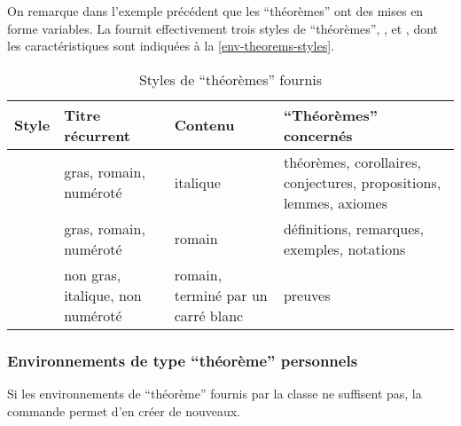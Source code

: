 \documentclass[french,nolocaltoc]{nwejmart}
\newtheorem[title=Fait,style=definition]{fact}
\begin{document}
On remarque dans l'exemple précédent que les \enquote{théorèmes} ont des mises
en forme variables. La \nwejmauthorcl{} fournit effectivement trois styles de
\enquote{théorèmes}, ,  et
, dont les caractéristiques sont indiquées à la
\vref{env-theorems-styles}.

\begin{table}
  \centering
  \begin{tabulary}{\linewidth}{lLLL}
Style                 & Titre récurrent                  & Contenu                            & \enquote{Théorèmes} concernés               \\\toprule
{}    & gras, romain, numéroté           & italique
                      & théorèmes, corollaires, conjectures, propositions, lemmes, axiomes                                                  \\\midrule
{} & gras, romain, numéroté           & romain                             & définitions, remarques, exemples, notations \\\midrule
{}      & non gras, italique, non numéroté & romain, terminé par un carré blanc & preuves                                     \\\bottomrule
  \end{tabulary}
  \caption{Styles de \enquote{théorèmes} fournis}
  \label{env-theorems-styles}
\end{table}

\subsubsection{Environnements de type \enquote{théorème} personnels}
\label{sec:envir-de-type-1}

Si les environnements de \enquote{théorème} fournis par la classe ne suffisent
pas, la commande  permet d'en créer de nouveaux.
\end{document}
